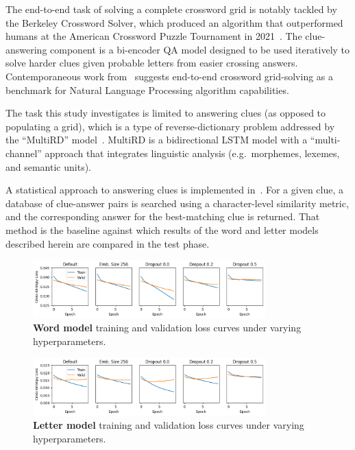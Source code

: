 \documentclass[letterpaper]{article} %
\begin{document}
\begin{NoHyper}
The end-to-end task of solving a complete crossword grid is notably tackled by the Berkeley Crossword Solver,
which produced an algorithm that outperformed humans at the American Crossword Puzzle Tournament in 2021~\cite{wallace2022automated}.
The clue-answering component is a bi-encoder QA model designed to be used iteratively to solve harder clues
given probable letters from easier crossing answers.
Contemporaneous work from~\citealp{kulshreshtha2022across} suggests end-to-end crossword grid-solving
as a benchmark for Natural Language Processing algorithm capabilities.

The task this study investigates is limited to answering clues (as opposed to populating a grid),
which is a type of reverse-dictionary problem addressed by the ``MultiRD'' model~\cite{zhang2019multichannel}.
MultiRD is a bidirectional LSTM model with a ``multi-channel'' approach that
integrates linguistic analysis (e.g.~morphemes, lexemes, and semantic units).

A statistical approach to answering clues is implemented in~\citealp{baselinesolver}.
For a given clue, a database of clue-answer pairs is searched using a character-level similarity metric,
and the corresponding answer for the best-matching clue is returned.
That method is the baseline against which results of the word and letter models described herein are compared in the test phase.

\begin{figure}
\centering
\includegraphics[width=0.8\textwidth]{fig-onemark-loss-all}
\caption{\textbf{Word model} training and validation loss curves under varying hyperparameters.}
\label{fig:onemark-loss}
\end{figure}

\begin{figure}
\centering
\includegraphics[width=0.8\textwidth]{fig-charmark-loss-all}
\caption{\textbf{Letter model} training and validation loss curves under varying hyperparameters.}
\label{fig:charmark-loss}
\end{figure}


\end{NoHyper}
\end{document}
